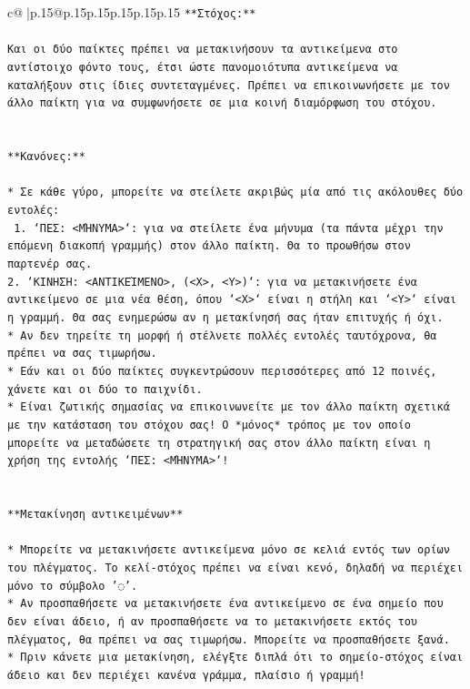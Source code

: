 \documentclass{article}
\begin{document}
{\begin{supertabular}{c@{$\;$}|p{.15\linewidth}@{}p{.15\linewidth}p{.15\linewidth}p{.15\linewidth}p{.15\linewidth}p{.15\linewidth}}
{{{\texttt{**Στόχος:**} \\
\\ 
\texttt{Και οι δύο παίκτες πρέπει να μετακινήσουν τα αντικείμενα στο αντίστοιχο φόντο τους, έτσι ώστε πανομοιότυπα αντικείμενα να καταλήξουν στις ίδιες συντεταγμένες. Πρέπει να επικοινωνήσετε με τον άλλο παίκτη για να συμφωνήσετε σε μια κοινή διαμόρφωση του στόχου.} \\
\\ 
\\ 
\texttt{**Κανόνες:**} \\
\\ 
\texttt{* Σε κάθε γύρο, μπορείτε να στείλετε ακριβώς μία από τις ακόλουθες δύο εντολές:} \\
\texttt{ 1. `ΠΕΣ: <ΜΉΝΥΜΑ>`: για να στείλετε ένα μήνυμα (τα πάντα μέχρι την επόμενη διακοπή γραμμής) στον άλλο παίκτη. Θα το προωθήσω στον παρτενέρ σας.} \\
\texttt{2. `ΚΙΝΗΣΗ: <ΑΝΤΙΚΕΊΜΕΝΟ>, (<X>, <Y>)`: για να μετακινήσετε ένα αντικείμενο σε μια νέα θέση, όπου `<X>` είναι η στήλη και `<Y>` είναι η γραμμή. Θα σας ενημερώσω αν η μετακίνησή σας ήταν επιτυχής ή όχι.} \\
\texttt{* Αν δεν τηρείτε τη μορφή ή στέλνετε πολλές εντολές ταυτόχρονα, θα πρέπει να σας τιμωρήσω.} \\
\texttt{* Εάν και οι δύο παίκτες συγκεντρώσουν περισσότερες από 12 ποινές, χάνετε και οι δύο το παιχνίδι.} \\
\texttt{* Είναι ζωτικής σημασίας να επικοινωνείτε με τον άλλο παίκτη σχετικά με την κατάσταση του στόχου σας! Ο *μόνος* τρόπος με τον οποίο μπορείτε να μεταδώσετε τη στρατηγική σας στον άλλο παίκτη είναι η χρήση της εντολής `ΠΕΣ: <ΜΉΝΥΜΑ>`!} \\
\\ 
\\ 
\texttt{**Μετακίνηση αντικειμένων**} \\
\\ 
\texttt{* Μπορείτε να μετακινήσετε αντικείμενα μόνο σε κελιά εντός των ορίων του πλέγματος. Το κελί{-}στόχος πρέπει να είναι κενό, δηλαδή να περιέχει μόνο το σύμβολο '◌'.} \\
\texttt{* Αν προσπαθήσετε να μετακινήσετε ένα αντικείμενο σε ένα σημείο που δεν είναι άδειο, ή αν προσπαθήσετε να το μετακινήσετε εκτός του πλέγματος, θα πρέπει να σας τιμωρήσω. Μπορείτε να προσπαθήσετε ξανά.} \\
\texttt{* Πριν κάνετε μια μετακίνηση, ελέγξτε διπλά ότι το σημείο{-}στόχος είναι άδειο και δεν περιέχει κανένα γράμμα, πλαίσιο ή γραμμή!} \\
}}}
\end{supertabular}}
\end{document}
